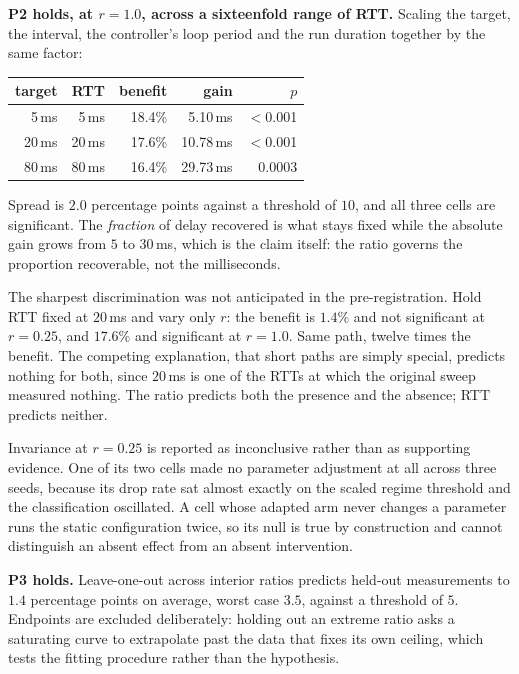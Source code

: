 \textbf{P2 holds, at $r = 1.0$, across a sixteenfold range of RTT.} Scaling the
target, the interval, the controller's loop period and the run duration
together by the same factor:

\begin{center}
\small
\begin{tabular}{rrrrr}
\hline
target & RTT & benefit & gain & $p$ \\
\hline
5\,ms & 5\,ms & 18.4\% & 5.10\,ms & $<$0.001 \\
20\,ms & 20\,ms & 17.6\% & 10.78\,ms & $<$0.001 \\
80\,ms & 80\,ms & 16.4\% & 29.73\,ms & 0.0003 \\
\hline
\end{tabular}
\end{center}

Spread is $2.0$ percentage points against a threshold of $10$, and all
three cells are significant. The \emph{fraction} of delay recovered is what
stays fixed while the absolute gain grows from $5$ to $30$\,ms, which is the
claim itself: the ratio governs the proportion recoverable, not the
milliseconds.

The sharpest discrimination was not anticipated in the pre-registration. Hold
RTT fixed at $20$\,ms and vary only $r$: the benefit is $1.4\%$ and not
significant at $r = 0.25$, and $17.6\%$ and significant at $r = 1.0$. Same
path, twelve times the benefit. The competing explanation, that short paths are
simply special, predicts nothing for both, since $20$\,ms is one of the RTTs at
which the original sweep measured nothing. The ratio predicts both the presence
and the absence; RTT predicts neither.

Invariance at $r = 0.25$ is reported as inconclusive rather than as
supporting evidence. One of its two cells made no parameter adjustment at all
across three seeds, because its drop rate sat almost exactly on the scaled
regime threshold and the classification oscillated. A cell whose adapted arm
never changes a parameter runs the static configuration twice, so its null is
true by construction and cannot distinguish an absent effect from an absent
intervention.

\textbf{P3 holds.} Leave-one-out across interior ratios predicts held-out
measurements to $1.4$ percentage points on average, worst case $3.5$, against a
threshold of $5$. Endpoints are excluded deliberately: holding out an extreme
ratio asks a saturating curve to extrapolate past the data that fixes its own
ceiling, which tests the fitting procedure rather than the hypothesis.

